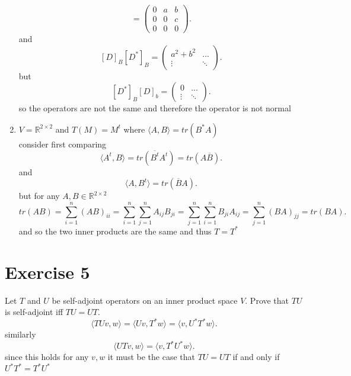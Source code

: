 \documentclass{article}
\begin{document}
\begin{enumerate}[label = (\alph*)]
\[                    = \begin{pmatrix} 0 & a & b\\
                    0 & 0 & c \\
                    0 & 0 & 0
                    \end{pmatrix} 
            .\] 
            and
            \[
                [D]_B[D^{*}]_B = \begin{pmatrix}  a^2 + b^2 & ... \\ \vdots & \ddots\end{pmatrix} 
            .\] 
            but
            \[
                [D^{*}]_B[D]_b = \begin{pmatrix}  0 & ... \\ \vdots & \ddots \end{pmatrix} 
            .\] 
            so the operators are not the same and therefore the operator is not normal
        \item $V = \mathbb{R}^{2 \times 2}$ and $T(M) = M^{t}$ where $\langle A, B \rangle = tr(B^{*}A)$\\
            consider first comparing
            \[
            \langle A^{t}, B \rangle = tr(\overline{B^{t}}A^{t}) = tr(A\overline{B})
            .\] 
            and
            \[
            \langle A, B^{t} \rangle = tr(\overline{B}A)
            .\] 
            but for any $A, B \in \mathbb{R}^{2 \times 2}$ 
            \[
                tr(AB) = \sum_{i=1}^{n}(AB)_{ii} = \sum_{i=1}^{n}\sum_{j=1}^{n}A_{ij}B_{ji} = \sum_{j=1}^{n}\sum_{i=1}^{n}B_{ji}A_{ij} = \sum_{j=1}^{n}(BA)_{jj} = tr(BA)
            .\] 
            and so the two inner products are the same and thus $T = T^{*}$
    \end{enumerate}

    \section{Exercise 5}
    Let $T$ and $U$ be self-adjoint operators on an inner product space $V$. Prove that $TU$ is self-adjoint iff $TU = UT$.
     \[
    \langle TU v, w \rangle = \langle Uv , T^{*}w \rangle = \langle v, U^{*}T^{*}w \rangle
    .\] 
    similarly
    \[
    \langle UT v, w \rangle = \langle v, T^{*}U^{*}w \rangle
    .\]
    since this holds for any $v,w$ it must be the case that $TU = UT$ if and only if $U^{*}T^{*} = T^{*}U^{*}$ 
\end{document}
